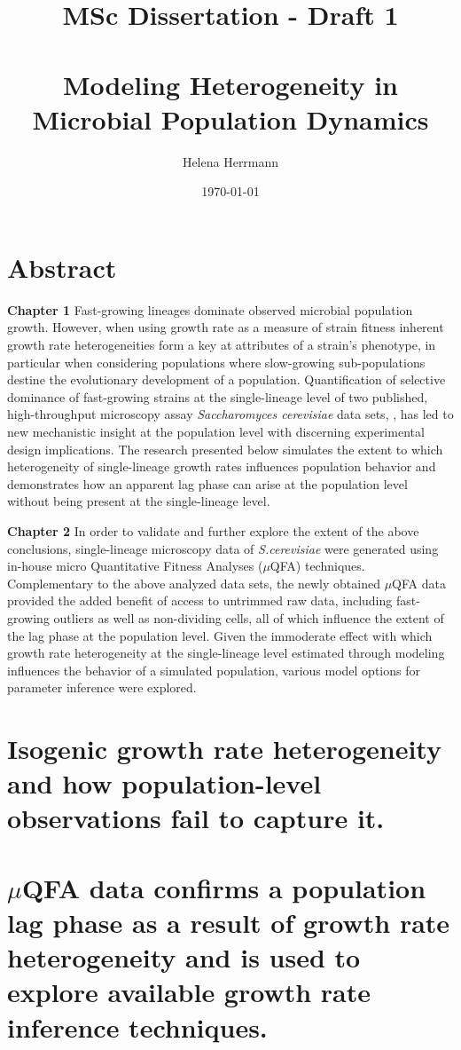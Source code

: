 \documentclass[a4paper]{article}
\title{MSc Dissertation - Draft 1 \\~\\ Modeling Heterogeneity in Microbial Population Dynamics}
\author{Helena Herrmann}
\date{\today}
\begin{document}
\maketitle

\section*{Abstract}

\textbf{Chapter 1} 
Fast-growing lineages dominate observed microbial population growth. However, when using growth rate as a measure of strain fitness inherent growth rate heterogeneities form a key at attributes of a strain's phenotype, in particular when considering populations where slow-growing sub-populations destine the evolutionary development of a population. Quantification of selective dominance of fast-growing strains at the single-lineage level of two published,  high-throughput microscopy assay \textit{Saccharomyces cerevisiae} data sets, \cite{Levy12,Ziv13}, has led to new mechanistic insight at the population level with discerning experimental design implications. The research presented below simulates the extent to which heterogeneity of single-lineage growth rates influences population behavior and demonstrates how an apparent lag phase can arise at the population level without being present at the single-lineage level.

\textbf{Chapter 2}
In order to validate and further explore the extent of the above conclusions, single-lineage microscopy data of \textit{S.cerevisiae} were generated using in-house micro Quantitative Fitness Analyses ($\mu$QFA) techniques. Complementary to the above analyzed data sets, the newly obtained $\mu$QFA data provided the added benefit of access to untrimmed raw data, including fast-growing outliers as well as non-dividing cells, all of which influence the extent of the lag phase at the population level. Given the immoderate effect with which growth rate heterogeneity at the single-lineage level estimated through modeling influences the behavior of a simulated population, various model options for parameter inference were explored. 

\section{Isogenic growth rate heterogeneity and how population-level observations fail to capture it.}

\section{$\mu$QFA data confirms a population lag phase as a result of growth rate heterogeneity and is used to explore available growth rate inference techniques.}
\end{document}
